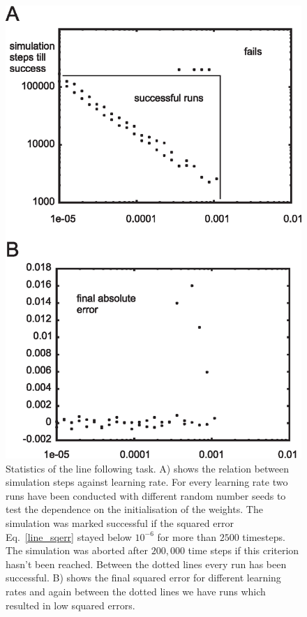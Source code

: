 \documentclass{llncs}
\begin{document}
\begin{figure}[h!]
  \centering
  \includegraphics[width=\columnwidth]{line_stats}
  \caption{Statistics of the line following task. A) shows the relation between
    simulation steps against learning rate. For every learning rate two runs have
    been conducted with different random number seeds to test the dependence on the
    initialisation of the weights. The simulation was marked successful if the
    squared error Eq.~\ref{line_sqerr} stayed below $10^{-6}$ for more than $2500$
    timesteps. The simulation was aborted after $200,000$ time steps if this criterion
    hasn't been reached. Between the dotted lines every run has been successful.
    B) shows the final squared error for different learning rates and again between
    the dotted lines we have runs which resulted in low squared errors.
    \label{line_stats}}
\end{figure}
\end{document}
